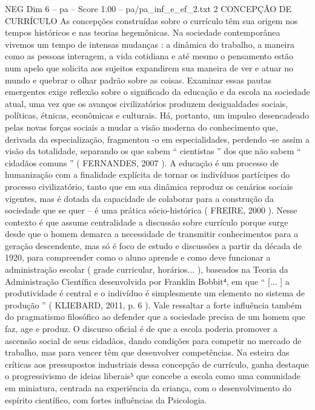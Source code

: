 \begin{textsample}{NEG Dim 6 – pa – Score 1.00 – pa/pa\_inf\_e\_ef\_2.txt}  \label{ex:f6_neg_228}
2 CONCEPÇÃO DE CURRÍCULO As concepções construídas sobre o currículo têm sua origem nos tempos históricos e nas teorias hegemônicas.
Na sociedade contemporânea vivemos um tempo de intensas mudanças : a dinâmica do trabalho, a maneira como as pessoas interagem, a vida cotidiana e até mesmo o pensamento estão num apelo que solicita aos sujeitos expandirem sua maneira de ver e atuar no mundo e quebrar o olhar padrão sobre as coisas.
Examinar essas pautas emergentes exige reflexão sobre o significado da educação e da escola na sociedade atual, uma vez que os avanços civilizatórios produzem desigualdades sociais, políticas, étnicas, econômicas e culturais.
Há, portanto, um impulso desencadeado pelas novas forças sociais a mudar a visão moderna do conhecimento que, derivada da especialização, fragmentou -o em especialidades, perdendo -se assim a visão da totalidade, separando os que sabem “ cientistas ” dos que não sabem “ cidadãos comuns ” ( FERNANDES, 2007 ).
A educação é um processo de humanização com a finalidade explícita de tornar os indivíduos partícipes do processo civilizatório, tanto que em sua dinâmica reproduz os cenários sociais vigentes, mas é dotada da capacidade de colaborar para a construção da sociedade que se quer – é uma prática sócio-histórica ( FREIRE, 2000 ).
Nesse contexto é que assume centralidade a discussão sobre currículo porque surge desde que o homem demarca a necessidade de transmitir conhecimentos para a geração descendente, mas só é foco de estudo e discussões a partir da década de 1920, para compreender como o aluno aprende e como deve funcionar a administração escolar ( grade curricular, horários... ), baseados na Teoria da Administração Científica desenvolvida por Franklin Bobbit⁴, em que “ [... ] a produtividade é central e o indivíduo é simplesmente um elemento no sistema de produção ” ( KLIEBARD, 2011, p. 6 ).
Vale ressaltar a forte influência também do pragmatismo filosófico ao defender que a sociedade precisa de um homem que faz, age e produz.
O discurso oficial é de que a escola poderia promover a ascensão social de seus cidadãos, dando condições para competir no mercado de trabalho, mas para vencer têm que desenvolver competências.
Na esteira das críticas aos pressupostos industriais dessa concepção de currículo, ganha destaque o progressivismo de ideias liberais⁵ que concebe a escola como uma comunidade em miniatura, centrada na experiência da criança, com o desenvolvimento do espírito científico, com fortes influências da Psicologia.

\end{textsample}
